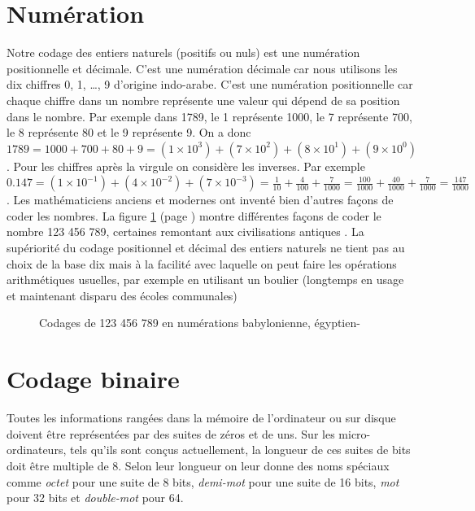 \section{Numération}
Notre codage des entiers naturels (positifs ou nuls) est une numération positionnelle et décimale.
C'est une numération décimale car nous utilisons les dix chiffres 0, 1, \ldots, 9 d'origine
indo-arabe. C'est une numération positionnelle car chaque chiffre dans un nombre représente une
valeur qui dépend de sa position dans le nombre. Par exemple dans 1789, le 1 représente 1000,
le 7 représente 700, le 8 représente 80 et le 9 représente 9. On a donc $1789 = 1000 + 700
+ 80 + 9 = (1 \times 10^{3}) +  (7 \times 10^{2}) +  (8 \times 10^{1}) + (9 \times 10^{0})$.  
Pour les chiffres après la virgule on considère les inverses. Par exemple $0.147= (1\times 10^{-1})+
(4\times 10^{-2})+(7\times 10^{-3})=\frac{1}{10}+\frac{4}{100}+\frac{7}{1000}=\frac{100}{1000}+\frac{40}{1000}+\frac{7}{1000}=\frac{147}{1000}$.
Les
mathématiciens anciens et modernes ont inventé bien d'autres façons de coder les nombres. 
La figure \ref{fig:code1-9} (page \pageref{fig:code1-9}) montre différentes façons de coder le nombre
123 456 789, certaines remontant aux civilisations antiques \cite{guitel}. La supériorité du
codage positionnel et décimal des entiers naturels ne tient pas au choix de la base dix mais
à la facilité avec laquelle on peut faire les opérations
arithmétiques usuelles, par exemple en utilisant un boulier (longtemps en usage et maintenant disparu des écoles
communales)

\begin{figure}[htbp]
 \caption{Codages de 123 456 789 en numérations babylonienne, égyptien-\label{fig:code1-9}}
\end{figure}


\section{Codage binaire}

Toutes les informations rangées dans la mémoire de l'ordinateur ou sur disque doivent
être représentées par des suites de zéros et de uns. Sur les micro-ordinateurs,
tels qu'ils sont conçus actuellement, la longueur de ces suites de bits doit être multiple
de 8. Selon leur longueur on leur donne des noms spéciaux comme {\em octet} pour une suite
de 8 bits, {\em demi-mot} pour une suite de 16 bits, {\em mot} pour 32 bits et {\em double-mot}
pour 64.


